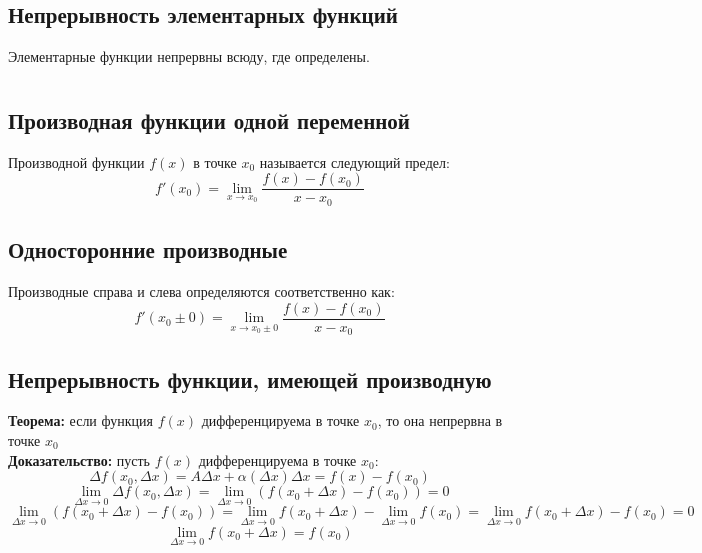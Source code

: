 \documentclass{article}
\newcommand{\theorem}{\textbf{Теорема:} }
\newcommand{\proof}{\textbf{Доказательство:} }
\begin{document}
    \subsection{Непрерывность элементарных функций}
        Элементарные функции непрервны всюду, где определены.
        

    \newpage
    
    \section{}
    \subsection*{Производная функции одной переменной}
        Производной функции $f(x)$ в точке $x_0$ называется следующий предел:
        \[ f'(x_0) = \lim_{x \to x_0} \frac{f(x) - f(x_0)}{x - x_0} \]
        
        
    \subsection*{Односторонние производные}
        Производные справа и слева определяются соответственно как:
        \[ f'(x_0 \pm 0) = \lim_{x \to x_0 \pm 0} \frac{f(x) - f(x_0)}{x - x_0} \]
        
        
    \subsection*{Непрерывность функции, имеющей производную}
        \theorem если функция $f(x)$ дифференцируема в точке $x_0$, то она непрервна в точке $x_0$
        \\
        \proof пусть $f(x)$ дифференцируема в точке $x_0$:
        \[ \Delta f(x_0, \Delta x) = A \Delta x + \alpha(\Delta x) \Delta x = f(x) - f(x_0) \]
        \[ \lim_{\Delta x \to 0} \Delta f(x_0, \Delta x) = \lim_{\Delta x \to 0} \left( f(x_0 + \Delta x) - f(x_0) \right) = 0 \]
        \[ \lim_{\Delta x \to 0} \left( f(x_0 + \Delta x) - f(x_0) \right) = \lim_{\Delta x \to 0} f(x_0 + \Delta x) - \lim_{\Delta x \to 0} f(x_0) =
           \lim_{\Delta x \to 0} f(x_0 + \Delta x) - f(x_0) = 0 \]
        \[ \lim_{\Delta x \to 0} f(x_0 + \Delta x) = f(x_0) \]
\end{document}
